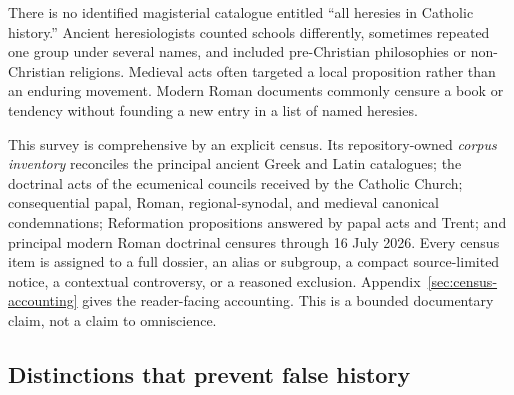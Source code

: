 {There is no identified magisterial catalogue entitled ``all heresies in Catholic history.'' Ancient heresiologists counted schools differently, sometimes repeated one group under several names, and included pre-Christian philosophies or non-Christian religions. Medieval acts often targeted a local proposition rather than an enduring movement. Modern Roman documents commonly censure a book or tendency without founding a new entry in a list of named heresies.

This survey is comprehensive by an explicit census. Its repository-owned \emph{corpus inventory} reconciles the principal ancient Greek and Latin catalogues; the doctrinal acts of the ecumenical councils received by the Catholic Church; consequential papal, Roman, regional-synodal, and medieval canonical condemnations; Reformation propositions answered by papal acts and Trent; and principal modern Roman doctrinal censures through 16 July 2026. Every census item is assigned to a full dossier, an alias or subgroup, a compact source-limited notice, a contextual controversy, or a reasoned exclusion. Appendix~\ref{sec:census-accounting} gives the reader-facing accounting. This is a bounded documentary claim, not a claim to omniscience.

\subsection{Distinctions that prevent false history}

}
